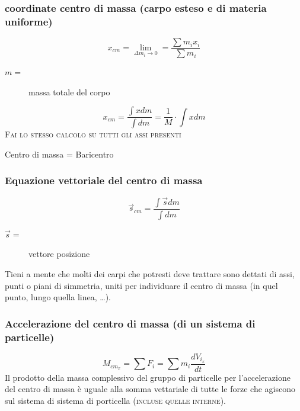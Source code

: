 \documentclass{book}
\begin{document}
\subsubsection{coordinate centro di massa (carpo esteso e di materia uniforme)}
\label{sec:coordcentdimassa}

\begin{equation}
  \label{eq:coordcentdimassa}
  x_{cm}=\lim\limits_{\Delta m_i\to 0}= \frac{\sum m_ix_i}{\sum m_i}
\end{equation}
\begin{description}
\item[$m=$] massa totale del corpo
\end{description}
\begin{equation*}
  x_{cm}=\frac{\int x dm}{\int dm}=\frac{1}{M}\cdot \int x dm
\end{equation*}
\textsc{Fai lo stesso calcolo su tutti gli assi presenti}
\begin{center}
  Centro di massa = Baricentro
\end{center}

\subsubsection{Equazione vettoriale del centro di massa}
\label{sec:eqvettdelcentrodimassa}

\begin{equation}
  \label{eq:eqvettdelcentrodimassa}
  \vec{s}_{cm}=\frac{\int \vec{s}dm}{\int dm}
\end{equation}
\begin{description}
\item[$\vec{s}=$] vettore posizione 
\end{description}
Tieni a mente che molti dei carpi che potresti deve trattare sono dettati di assi, punti o piani di {\color{red}simmetria}, uniti per individuare il centro di massa (in quel punto, lungo quella linea, \dots).

\subsubsection{Accelerazione del centro di massa (di un sistema di particelle)}
\label{sec:accdelcentrodimass}
\begin{equation}
  \label{eq:accdelcentrodimass}
  M_{cm_x}=\sum F_i = \sum m_i\frac{dV_{i_x}}{dt}
\end{equation}
Il prodotto della massa complessivo del gruppo di particelle per l'accelerazione del centro di massa è uguale alla somma vettariale di tutte le forze che agiscono sul sistema di sistema di porticella (\textsc{incluse quelle interne}).
\end{document}
